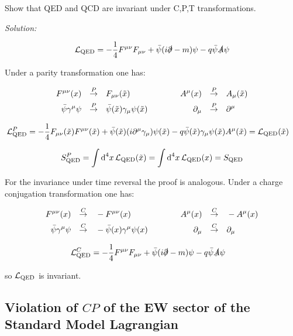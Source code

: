 \documentclass[TheoreticalPhy_ModB.tex]{subfiles}
\begin{document}
\begin{exercise}

Show that QED and QCD are invariant under C,P,T transformations.

\noindent
\textit{Solution:}

\[\mathcal L_{\text{QED}}=-\frac14F^{{\mu\nu}}F_{\mu\nu}+\bar\psi(i\slashed\partial-m)\psi-q\bar\psi\slashed A\psi\]

Under a parity transformation one has:

\[\begin{aligned}
F^{\mu\nu}(x)&&\overset{P}{\to}\quad&F_{\mu\nu}(\tilde x)&&\quad&&&A^\mu(x)&&\overset{P}{\to}\quad&A_\mu(\tilde x)\\
\bar\psi\gamma^\mu\psi&&\overset{P}{\to}\quad&\bar\psi(\tilde x)\gamma_\mu\psi(\tilde x)&&\quad&&&\partial_\mu&&\overset{P}{\to}\quad&\partial^\mu
\end{aligned}\]

\[\begin{aligned}
\mathcal L_{\text{QED}}^P&=-\frac14F_{\mu\nu}(\tilde x)F^{\mu\nu}(\tilde x)+\bar\psi(\tilde x)(i\partial^\mu\gamma_\mu)\psi(\tilde x) - q\bar\psi(\tilde x)\gamma_\mu\psi(\tilde x)A^\mu(\tilde x)=\mathcal L_{\text{QED}}(\tilde x)
\end{aligned}\]

\[\begin{aligned}
S_{\text{QED}}^P = \int\textup{d}^4x\,\mathcal L_{\text{QED}}(\tilde x)=\int\textup{d}^4x\,\mathcal L_{\text{QED}}(x)=S_{\text{QED}}
\end{aligned}\]

For the invariance under time reversal the proof is analogous.
Under a charge conjugation transformation one has:

\[\begin{aligned}
F^{\mu\nu}(x)&&\overset{C}{\to}\quad&-F^{\mu\nu}( x)&&\quad&&&A^\mu(x)&&\overset{C}{\to}\quad&-A^\mu( x)\\
\bar\psi\gamma^\mu\psi&&\overset{C}{\to}\quad&-\bar\psi( x)\gamma^\mu\psi( x)&&\quad&&&\partial_\mu&&\overset{C}{\to}\quad&\partial_\mu
\end{aligned}\]

\[\begin{aligned}
\mathcal L_{\text{QED}}^C&=-\frac14F^{\mu\nu} F_{\mu\nu}+\bar\psi(i\slashed\partial-m)\psi-q\bar\psi\slashed A\psi
\end{aligned}\]

so $\mathcal L_{\text{QED}}$ is invariant. 

\end{exercise}

\subsection{Violation of $CP$ of the EW sector of the Standard Model Lagrangian}
\end{document}
